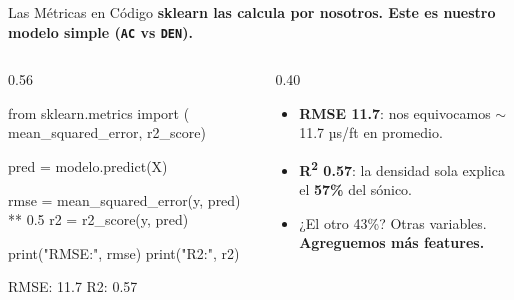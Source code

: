 \documentclass[aspectratio=169, 11pt]{beamer}
\begin{document}
\begin{frame}[fragile,shrink=30]{Las Métricas en Código}
  \vspace{-4pt}
  {\small\color{arcaDark}\bfseries
    sklearn las calcula por nosotros. Este es nuestro modelo simple (\texttt{AC} vs \texttt{DEN}).}

  \vspace{4pt}
  \begin{columns}[T]
    \begin{column}{0.56\textwidth}
      \begin{pyblock}
from sklearn.metrics import (
    mean_squared_error, r2_score)

pred = modelo.predict(X)

rmse = mean_squared_error(y, pred) ** 0.5
r2 = r2_score(y, pred)

print("RMSE:", rmse)
print("R2:", r2)
      \end{pyblock}
      \vspace{2pt}
      \begin{outputblock}
RMSE: 11.7
R2: 0.57
      \end{outputblock}
    \end{column}
    \begin{column}{0.40\textwidth}
      {\scriptsize\color{textMuted}
      \begin{itemize}\setlength{\itemsep}{5pt}
        \item[{\color{codeGreen}\scriptsize\faCheck}]
          \textbf{RMSE 11.7}: nos equivocamos \(\sim\)11.7 µs/ft
          en promedio.
        \item[{\color{codeGreen}\scriptsize\faCheck}]
          \textbf{R\textsuperscript{2} 0.57}: la densidad sola explica el
          \textbf{57\%} del sónico.
        \item[{\color{arcaRed}\scriptsize\faArrowRight}]
          ¿El otro 43\%? Otras variables.
          \textbf{Agreguemos más features.}
      \end{itemize}
      }
    \end{column}
  \end{columns}
\end{frame}

%
\end{document}
